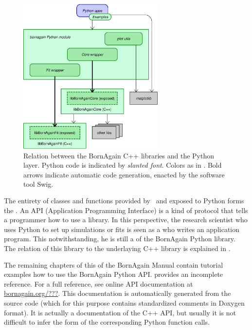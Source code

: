 \begin{figure}[tb]
\begin{center}
\includegraphics[width=0.65\textwidth]{fig/drawing/architecturePy.ps}
\end{center}
\caption{Relation between the BornAgain C++ libraries and the Python layer.
%
Python code is indicated by \textsl{slanted font}.
Colors as in .
Bold arrows indicate automatic code generation, enacted by the software tool Swig.%
%
%
}
\label{FarchPy}
\end{figure}

The entirety of classes and functions provided by \BornAgain\
and exposed to Python forms the .
An API (Application Programming Interface)
is a kind of protocol that tells a programmer how to use a library.
In this perspective, the research scientist
who uses Python to set up simulations or fits
is seen as a  who writes an application program.
This notwithstanding, he is still a 
of the BornAgain Python library.
The relation of this library to the underlaying C++ library is explained
in \Cref{FarchiPy}.

The remaining chapters of this  of the BornAgain Manual
contain tutorial examples how to use the BornAgain Python API.
 provides an incomplete reference.
For a full reference, see online API documentation at
\url{bornagain.org/???}.
This documentation is automatically generated from the source code
(which for this purpose contains standardized comments in Doxygen format).
\index{Doxygen}
It is actually a documentation of the C++ API,
but usually it is not difficult to infer the form of the corresponding Python
function calls.

